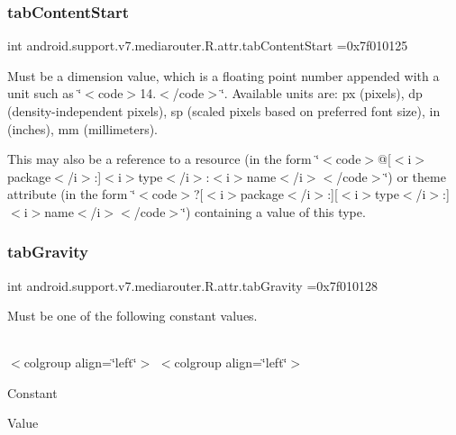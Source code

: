 \subsubsection{\texorpdfstring{tab\+Content\+Start}{tabContentStart}}
{\footnotesize\ttfamily int android.\+support.\+v7.\+mediarouter.\+R.\+attr.\+tab\+Content\+Start =0x7f010125\hspace{0.3cm}{\ttfamily [static]}}

Must be a dimension value, which is a floating point number appended with a unit such as \char`\"{}$<$code$>$14.\+5sp$<$/code$>$\char`\"{}. Available units are\+: px (pixels), dp (density-\/independent pixels), sp (scaled pixels based on preferred font size), in (inches), mm (millimeters). 

This may also be a reference to a resource (in the form \char`\"{}$<$code$>$@\mbox{[}$<$i$>$package$<$/i$>$\+:\mbox{]}$<$i$>$type$<$/i$>$\+:$<$i$>$name$<$/i$>$$<$/code$>$\char`\"{}) or theme attribute (in the form \char`\"{}$<$code$>$?\mbox{[}$<$i$>$package$<$/i$>$\+:\mbox{]}\mbox{[}$<$i$>$type$<$/i$>$\+:\mbox{]}$<$i$>$name$<$/i$>$$<$/code$>$\char`\"{}) containing a value of this type. \mbox{\label{classandroid_1_1support_1_1v7_1_1mediarouter_1_1R_1_1attr_af2a23c12df456b47f80096e89092fabd}} 
\subsubsection{\texorpdfstring{tab\+Gravity}{tabGravity}}
{\footnotesize\ttfamily int android.\+support.\+v7.\+mediarouter.\+R.\+attr.\+tab\+Gravity =0x7f010128\hspace{0.3cm}{\ttfamily [static]}}

Must be one of the following constant values.

\tabulinesep=1mm
\begin{longtabu} spread 0pt [c]{*{0}{|X[-1]}|}
\hline
\end{longtabu}
$<$colgroup align=\char`\"{}left\char`\"{}$>$ $<$colgroup align=\char`\"{}left\char`\"{}$>$ 

Constant

Value

